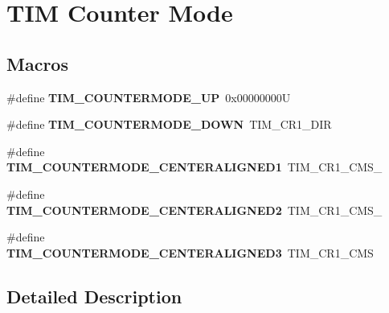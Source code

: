 \hypertarget{group___t_i_m___counter___mode}{}\section{T\+IM Counter Mode}
\label{group___t_i_m___counter___mode}
\subsection*{Macros}
\begin{DoxyCompactItemize}
\item 
\mbox{\label{group___t_i_m___counter___mode_ga9eb9ab91119c2c76d4db453d599c0b7d}} 
\#define {\bfseries T\+I\+M\+\_\+\+C\+O\+U\+N\+T\+E\+R\+M\+O\+D\+E\+\_\+\+UP}~0x00000000U
\item 
\mbox{\label{group___t_i_m___counter___mode_ga5f590fdd7c41df7180b870bb76ff691c}} 
\#define {\bfseries T\+I\+M\+\_\+\+C\+O\+U\+N\+T\+E\+R\+M\+O\+D\+E\+\_\+\+D\+O\+WN}~T\+I\+M\+\_\+\+C\+R1\+\_\+\+D\+IR
\item 
\mbox{\label{group___t_i_m___counter___mode_ga26d8e5236c35d85c2abaa482b5ec6746}} 
\#define {\bfseries T\+I\+M\+\_\+\+C\+O\+U\+N\+T\+E\+R\+M\+O\+D\+E\+\_\+\+C\+E\+N\+T\+E\+R\+A\+L\+I\+G\+N\+E\+D1}~T\+I\+M\+\_\+\+C\+R1\+\_\+\+C\+M\+S\+\_
\item 
\mbox{\label{group___t_i_m___counter___mode_gae4517c68086ffa61a694576cec8fe634}} 
\#define {\bfseries T\+I\+M\+\_\+\+C\+O\+U\+N\+T\+E\+R\+M\+O\+D\+E\+\_\+\+C\+E\+N\+T\+E\+R\+A\+L\+I\+G\+N\+E\+D2}~T\+I\+M\+\_\+\+C\+R1\+\_\+\+C\+M\+S\+\_
\item 
\mbox{\label{group___t_i_m___counter___mode_gaf0c3edf6ea1ade3520ab4970e1fc6e92}} 
\#define {\bfseries T\+I\+M\+\_\+\+C\+O\+U\+N\+T\+E\+R\+M\+O\+D\+E\+\_\+\+C\+E\+N\+T\+E\+R\+A\+L\+I\+G\+N\+E\+D3}~T\+I\+M\+\_\+\+C\+R1\+\_\+\+C\+MS
\end{DoxyCompactItemize}


\subsection{Detailed Description}
